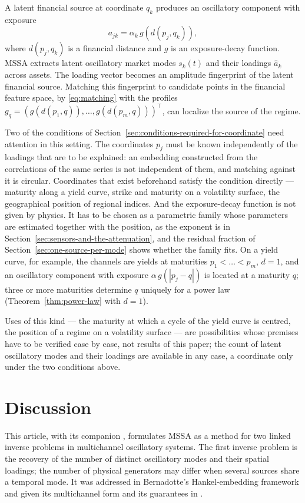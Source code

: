 \documentclass{article}
\begin{document}
A latent financial source at coordinate $q_k$ produces an oscillatory component with exposure \[
a_{jk} = \alpha_k\, g(d(p_j, q_k)),
\] where $d(p_j, q_k)$ is a financial distance and $g$ is an exposure-decay function. MSSA extracts latent oscillatory market modes $s_k(t)$ and their loadings $\widehat{a}_k$ across assets. The loading vector becomes an amplitude fingerprint of the latent financial source. Matching this fingerprint to candidate points in the financial feature space, by \eqref{eq:matching} with the profiles $g_q = (g(d(p_1, q)), \dots, g(d(p_m, q)))^{\top}$, can localize the source of the regime.

Two of the conditions of Section~\ref{sec:conditions-required-for-coordinate} need attention in this setting. The coordinates $p_j$ must be known independently of the loadings that are to be explained: an embedding constructed from the correlations of the same series is not independent of them, and matching against it is circular. Coordinates that exist beforehand satisfy the condition directly --- maturity along a yield curve, strike and maturity on a volatility surface, the geographical position of regional indices. And the exposure-decay function is not given by physics. It has to be chosen as a parametric family whose parameters are estimated together with the position, as the exponent is in Section~\ref{sec:sensors-and-the-attenuation}, and the residual fraction of Section~\ref{sec:one-source-per-mode} shows whether the family fits. On a yield curve, for example, the channels are yields at maturities $p_1 < \dots < p_m$, $d = 1$, and an oscillatory component with exposure $\alpha\, g(|p_j - q|)$ is located at a maturity $q$; three or more maturities determine $q$ uniquely for a power law (Theorem~\ref{thm:power-law} with $d = 1$).

Uses of this kind --- the maturity at which a cycle of the yield curve is centred, the position of a regime on a volatility surface --- are possibilities whose premises have to be verified case by case, not results of this paper; the count of latent oscillatory modes and their loadings are available in any case, a coordinate only under the two conditions above.

\section{Discussion}\label{sec:discussion}

This article, with its companion \cite{ref-companionA}, formulates MSSA as a method for two linked inverse problems in multichannel oscillatory systems. The first inverse problem is the recovery of the number of distinct oscillatory modes and their spatial loadings; the number of physical generators may differ when several sources share a temporal mode. It was addressed in Bernadotte's Hankel-embedding framework \cite{ref-BernadotteBuchstaber, ref-Bernadotte05} and given its multichannel form and its guarantees in \cite{ref-companionA}.
\end{document}
